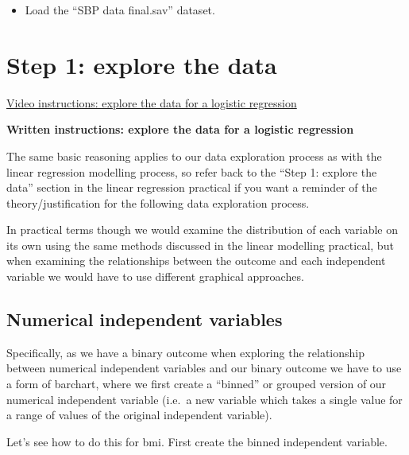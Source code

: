 \documentclass[
]{book}
\providecommand{\tightlist}{%
  \setlength{\itemsep}{0pt}\setlength{\parskip}{0pt}}
\begin{document}
\begin{itemize}
\tightlist
\item
  Load the ``SBP data final.sav'' dataset.
\end{itemize}

\hypertarget{step-1-explore-the-data-1}{%
\section{Step 1: explore the data}\label{step-1-explore-the-data-1}}

\href{https://youtu.be/uMGDhnJyl7I}{Video instructions: explore the data for a logistic regression}

\textbf{Written instructions: explore the data for a logistic regression}

The same basic reasoning applies to our data exploration process as with the linear regression modelling process, so refer back to the ``Step 1: explore the data'' section in the linear regression practical if you want a reminder of the theory/justification for the following data exploration process.

In practical terms though we would examine the distribution of each variable on its own using the same methods discussed in the linear modelling practical, but when examining the relationships between the outcome and each independent variable we would have to use different graphical approaches.

\hypertarget{numerical-independent-variables-1}{%
\subsection{Numerical independent variables}\label{numerical-independent-variables-1}}

Specifically, as we have a binary outcome when exploring the relationship between numerical independent variables and our binary outcome we have to use a form of barchart, where we first create a ``binned'' or grouped version of our numerical independent variable (i.e.~a new variable which takes a single value for a range of values of the original independent variable).

Let's see how to do this for bmi. First create the binned independent variable.
\end{document}
